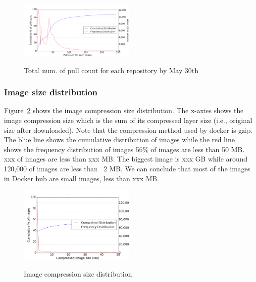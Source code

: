 \begin{figure}
	\centering
	\includegraphics[width=0.5\textwidth]{graphs/Pull_count_for_each_image.png}\\
	\caption{Total num. of pull count for each repository by May 30th}\label{fig_pull_cnt_total}
\end{figure}


\subsubsection{Image size distribution}

Figure~\ref{fig_image_size_compression} shows the image compression size distribution. The x-axies shows the image compression size which is the sum of its compressed layer size (i.e., original size after downloaded). Note that the compression method used by docker is gzip. The blue line shows the cumulative distribution of images while the red line shows the frequency distribution of images 
56\% of images are less than 50 MB. xxx of images are less than xxx MB. The biggest image is xxx GB while around 120,000 of images are less than ~2 MB. We can conclude that most of the images in Docker hub are small images, less than xxx MB.

\begin{figure}
	\centering
	\includegraphics[width=0.5\textwidth]{graphs/Compressed_image_size_(MB)}\\
	\caption{Image compression size distribution}\label{fig_image_size_compression}
\end{figure}


